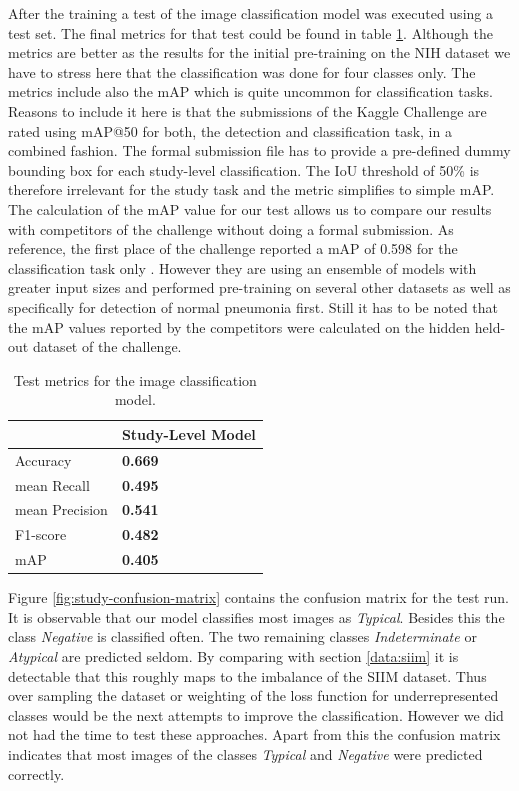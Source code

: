 After the training a test of the image classification model was executed using a test set. The final metrics for that test could be found in table \ref{table:study-results}. Although the metrics are better as the results for the initial pre-training on the NIH dataset we have to stress here that the classification was done for four classes only. The metrics include also the \ac{mAP} which is quite uncommon for classification tasks. Reasons to include it here is that the submissions of the Kaggle Challenge are rated using \ac{mAP}@50 for both, the detection and classification task, in a combined fashion. The formal submission file has to provide a pre-defined dummy bounding box for each study-level classification. The \ac{IoU} threshold of 50\% is therefore irrelevant for the study task and the metric simplifies to simple \ac{mAP}. The calculation of the \ac{mAP} value for our test allows us to compare our results with competitors of the challenge without doing a formal submission. As reference, the first place of the challenge reported a \ac{mAP} of 0.598 for the classification task only \autocite{SIIMFirstPlace}. However they are using an ensemble of models with greater input sizes and performed pre-training on several other datasets as well as specifically for detection of normal pneumonia first. Still it has to be noted that the \ac{mAP} values reported by the competitors were calculated on the hidden held-out dataset of the challenge.
\begin{table}
	\begin{tabular}{l|l}
		&    Study-Level Model  \\ \hline
		Accuracy 		& \textbf{0.669} \\
		mean Recall		& \textbf{0.495} \\
		mean Precision	& \textbf{0.541} \\
		F1-score		& \textbf{0.482} \\
		mAP 	    	& \textbf{0.405} \\
	\end{tabular}
	\centering
	\caption{Test metrics for the image classification model.}
	\label{table:study-results}
\end{table}
Figure \ref{fig:study-confusion-matrix} contains the confusion matrix for the test run. It is observable that our model classifies most images as \textit{Typical}. Besides this the class \textit{Negative} is classified often. The two remaining classes \textit{Indeterminate} or \textit{Atypical} are predicted seldom. By comparing with section \ref{data:siim} it is detectable that this roughly maps to the imbalance of the SIIM dataset. Thus over sampling the dataset or weighting of the loss function for underrepresented classes would be the next attempts to improve the classification. However we did not had the time to test these approaches. Apart from this the confusion matrix indicates that most images of the classes \textit{Typical} and \textit{Negative} were predicted correctly.
